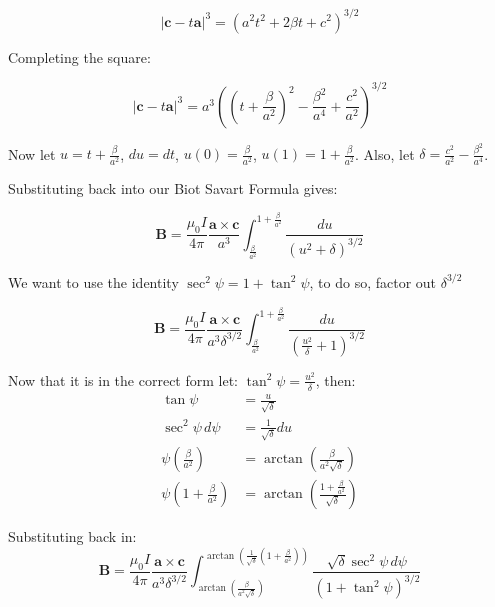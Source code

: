 \begin{equation*}
  \left\vert \mathbf{c} - t\mathbf{a} \right \vert ^3 =  \left( a^2t^2 + 2\beta t + c^2  \right)^{3/2}
\end{equation*}

Completing the square:

\begin{equation*}
  \left\vert \mathbf{c} - t\mathbf{a} \right \vert ^3 =  a^{3} \left( \left ( t + \frac{\beta}{a^2} \right)^2 -\frac{\beta^2}{a^4} + \frac{c^2}{a^2} \right)^{3/2}
\end{equation*}

Now let $u = t + \frac{\beta}{a^2}$, $du = dt$, $u(0) = \frac{\beta}{a^2}$, $u(1) = 1 + \frac{\beta}{a^2}$. Also, let $\delta = \frac{c^2}{a^2} - \frac{\beta^2}{a^4}$.

Substituting back into our Biot Savart Formula gives:

\begin{equation*}
  \mathbf{B} = \frac{\mu_0 I}{4\pi} \frac{\mathbf{a} \times \mathbf{c}}{a^3} \int_{\frac{\beta}{a^2}}^{1+\frac{\beta}{a^2}} \frac{du}{\left(u^2 + \delta\right)^{3/2}}
\end{equation*}

We want to use the identity $\sec^2\psi = 1 + \tan^2\psi$, to do so, factor out $\delta^{3/2}$

\begin{equation*}
  \mathbf{B} = \frac{\mu_0 I}{4\pi} \frac{\mathbf{a} \times \mathbf{c}}{a^3\delta^{3/2}} \int_{\frac{\beta}{a^2}}^{1+\frac{\beta}{a^2}} \frac{du}{\left(\frac{u^2}{\delta} + 1 \right)^{3/2}}
\end{equation*}

Now that it is in the correct form let: $\tan^2\psi = \frac{u^2}{\delta}$, then: 
\begin{align*}
  \tan\psi &= \frac{u}{\sqrt{\delta}} \\
  \sec^2\psi \, d\psi &= \frac{1}{\sqrt{\delta}} du \\
  \psi\left(\frac{\beta}{a^2}\right) &= \arctan \left( \frac{\beta}{a^2\sqrt{\delta}} \right) \\
  \psi\left( 1 + \frac{\beta}{a^2} \right) &= \arctan \left( \frac{1+\frac{\beta}{a^2}}{\sqrt{\delta}} \right)
\end{align*}

Substituting back in:
\begin{equation*}
  \mathbf{B} = \frac{\mu_0 I}{4\pi} \frac{\mathbf{a} \times \mathbf{c}}{a^3\delta^{3/2}} \int_{\arctan\left (\frac{\beta}{a^2\sqrt{\delta}}\right)}^{\arctan\left(\frac{1}{\sqrt{\delta}}\left(1+\frac{\beta}{a^2}\right)\right)} \frac{\sqrt{\delta} \sec^2 \psi \, d\psi}{\left(1 + \tan^2\psi \right)^{3/2}}
\end{equation*}

